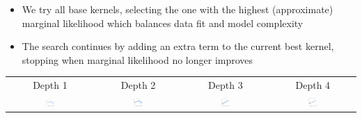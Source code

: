 \documentclass[portrait,a0b,final,a4resizeable]{a0poster}
\newenvironment{poster}{
  \begin{center}
  \begin{minipage}[c]{0.95\textwidth}
}{
  \end{minipage} 
  \end{center}
}
\begin{document}
\begin{poster}
\begin{multicols}{2}
\begin{itemize}
  \item We try all base kernels, selecting the one with the highest (approximate) marginal likelihood which balances data fit and model complexity
  \item The search continues by adding an extra term to the current best kernel, stopping when marginal likelihood no longer improves
\end{itemize}

\begin{center}
  
\end{center}

\vspace{12\baselineskip}

\begin{center}
  \begin{tabular}{cccc}
  Depth 1 & Depth 2 & Depth 3 & Depth 4 \\
          \includegraphics[width=0.11\textwidth]{../figures/11-Feb-v4-03-mauna2003-s_max_level_0/03-mauna2003-s_all_small.pdf} &
        \includegraphics[width=0.11\textwidth]{../figures/11-Feb-v4-03-mauna2003-s_max_level_1/03-mauna2003-s_all_small.pdf} &
        \includegraphics[width=0.11\textwidth]{../figures/11-Feb-v4-03-mauna2003-s_max_level_2/03-mauna2003-s_all_small.pdf} &
        \includegraphics[width=0.11\textwidth]{../figures/11-Feb-v4-03-mauna2003-s_max_level_3/03-mauna2003-s_all_small.pdf}
\end{tabular}  
\end{center}

\vspace{1\baselineskip}


\end{multicols}
\end{poster}
\end{document}
